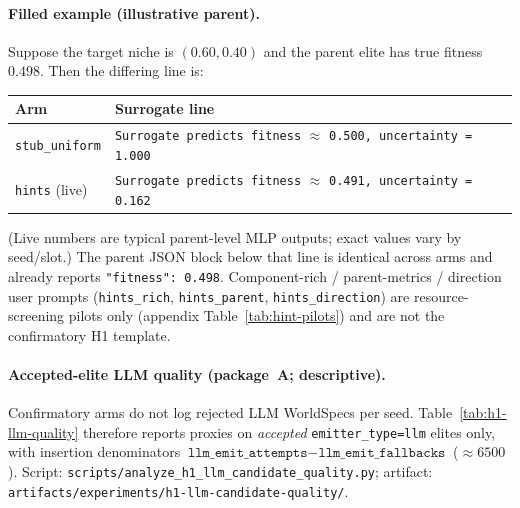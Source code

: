 \paragraph{Filled example (illustrative parent).}
Suppose the target niche is $(0.60,0.40)$ and the parent elite has true fitness $0.498$. Then the differing line is:
\begin{center}
\small
\begin{tabular}{@{}ll@{}}
\toprule
Arm & Surrogate line \\
\midrule
\texttt{stub\_uniform} & \texttt{Surrogate predicts fitness} $\approx$ \texttt{0.500, uncertainty = 1.000} \\
\texttt{hints} (live) & \texttt{Surrogate predicts fitness} $\approx$ \texttt{0.491, uncertainty = 0.162} \\
\bottomrule
\end{tabular}
\end{center}
(Live numbers are typical parent-level MLP outputs; exact values vary by seed/slot.) The parent JSON block below that line is identical across arms and already reports \texttt{"fitness": 0.498}. Component-rich / parent-metrics / direction user prompts (\texttt{hints\_rich}, \texttt{hints\_parent}, \texttt{hints\_direction}) are resource-screening pilots only (appendix Table~\ref{tab:hint-pilots}) and are not the confirmatory H1 template.

\paragraph{Accepted-elite LLM quality (package~A; descriptive).}
Confirmatory arms do not log rejected LLM WorldSpecs per seed. Table~\ref{tab:h1-llm-quality} therefore reports proxies on \emph{accepted} \texttt{emitter\_type=llm} elites only, with insertion denominators $\texttt{llm\_emit\_attempts}-\texttt{llm\_emit\_fallbacks}$ (${\approx}6500$). Script: \texttt{scripts/analyze\_h1\_llm\_candidate\_quality.py}; artifact: \texttt{artifacts/experiments/h1-llm-candidate-quality/}.

